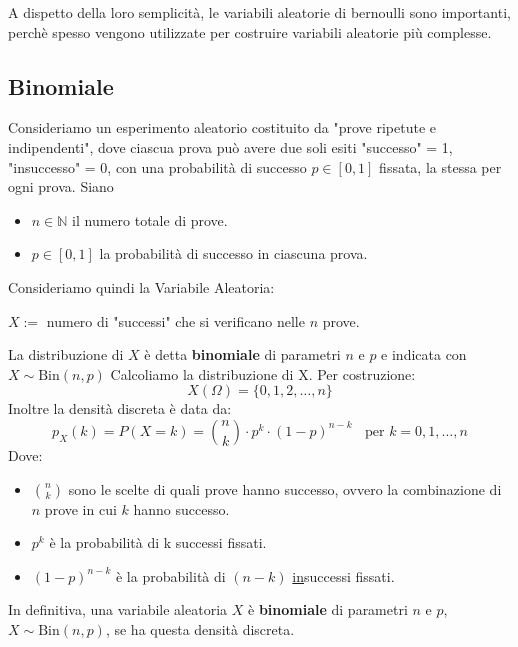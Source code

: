 A dispetto della loro semplicità, le variabili aleatorie di bernoulli sono importanti, perchè spesso
vengono utilizzate per costruire variabili aleatorie più complesse.

\subsection{Binomiale}
Consideriamo un esperimento aleatorio costituito da "prove ripetute e indipendenti",
dove ciascua prova può avere due soli esiti "successo" = 1, "insuccesso" = 0, con una
probabilità di successo $p \in [0,1]$ fissata, la stessa per ogni prova.
Siano \begin{itemize}
    \item $n \in \mathbb{N}$ il numero totale di prove.
    \item $p \in [0,1]$ la probabilità di successo in ciascuna prova.
\end{itemize}
Consideriamo quindi la Variabile Aleatoria:
\begin{center}
    $X:=$ numero di "successi" che si verificano nelle $n$ prove.
\end{center} 
La distribuzione di $X$ è detta \textbf{binomiale} di parametri $n$ e $p$ e indicata con $X \sim \text{Bin}(n,p)$
Calcoliamo la distribuzione di X. Per costruzione:
\[
    X(\Omega) = \{0,1,2,\dots,n\}
\]
Inoltre la densità discreta è data da:
\begin{equation*}
    p_X (k) = P(X=k) = \binom{n}{k} \cdot p^k \cdot (1-p)^{n-k} \;\;\text{ per } k = 0,1,\dots, n
\end{equation*}
Dove: \begin{itemize}
    \item $\binom{n}{k}$ sono le scelte di quali prove hanno successo,
    ovvero la combinazione di $n$ prove in cui $k$ hanno successo.
    \item $p^k$ è la probabilità di k successi fissati.
    \item $(1-p)^{n-k}$ è la probabilità di $(n-k)$ \underline{in}successi fissati.
\end{itemize}
In definitiva, una variabile aleatoria $X$ è \textbf{binomiale} di parametri $n$ e $p$, $X \sim \text{Bin}(n,p)$,
se ha questa densità discreta.

